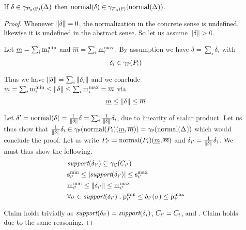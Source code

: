 \begin{lemma}
\label{lem:ppp:norm}
If $ \delta \in \gamma_{\mathcal{P}_{n}\left( \mathbb{P} \right)}(\Delta_{}) $ then $
  \text{normal}(\delta) \in \gamma_{\mathcal{P}_{n}\left( \mathbb{P} \right)}(\text{normal}(\Delta_{})) $.
\end{lemma}
\begin{proof}
\newcommand{\munder}{\underline{m}}
\newcommand{\mover}{\overline{m}}
Whenever $ \mathord{\parallel}\delta\mathord{\parallel} = 0 $, the normalization in the concrete
sense is undefined, likewise it is undefined in the abstract sense. So
let us assume $ \mathord{\parallel}\delta\mathord{\parallel} > 0 $.

Let $ \munder = \sum_i \mmin{i} $ and $ \mover = \sum_i \mmax{i} $. By
assumption we have $ \delta = \sum_i \delta_i $ with
\begin{align}
\label{thm:ppp:normal:given} \delta_i \in \ppconc{\pp{i}}
\end{align}

Thus we have $ \mathord{\parallel}\delta\mathord{\parallel} = \sum_i \mathord{\parallel}\delta_i\mathord{\parallel} $ and we
conclude $ \munder
= \sum_i \mmin{i} \leq \pmass{\delta} \leq \sum_i \mmax{i} = \mover $
via .
\begin{align} \label{thm:ppp:normal:claim1a} \munder \leq \pmass{\delta} \leq \mover \end{align}

Let $ \delta' = \text{normal}(\delta) = \frac{1}{\mathord{\parallel}\delta\mathord{\parallel}} \delta
= \sum_i \frac{1}{\mathord{\parallel}\delta\mathord{\parallel}} \delta_i $, due to linearity of
scalar product. Let us thus show that
$ \frac{1}{\pmass{\delta}} \delta_i \in \ppconc{\normal{\pp{i}}(\munder, \mover)}
= \ppconc{\normal{\pps{}}} $ which would conclude the proof. Let us
write $ \pp{i'} = \normal{\pp{i}}(\munder, \mover) $ and $ \delta_{i'}
= \frac{1}{\mathord{\parallel}\delta\mathord{\parallel}} \delta_i $. We must thus show the
following.
\begin{align}
\label{thm:ppp:normal:cond1} & \support{\delta_{i'}} \subseteq \pconc{\getpoly{i'}} \\
\label{thm:ppp:normal:cond2} & \smin{i'} \leq \setsize{\support{\delta_{i'}}} \leq \smax{i'} \\
\label{thm:ppp:normal:cond3} & \mmin{i'} \leq \pmass{\delta_{i'}} \leq \mmax{i'} \\
\label{thm:ppp:normal:cond4} & \forall \sigma \in \support{\delta_{i'}} \qsep \pmin{i'} \leq \delta_{i'}(\sigma) \leq \pmax{i'}
\end{align}

Claim  holds trivially as
$ \textit{support}(\delta_{i'}) = \textit{support}(\delta_i)$, $ C_{i'}
= C_{i} $,
and . Claim 
holds due to the same reasoning.


\end{proof}
